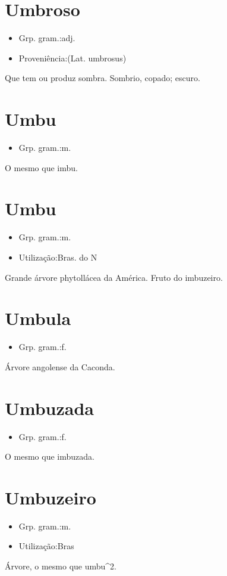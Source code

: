 \documentclass{article}
\begin{document}
\section{Umbroso}
\begin{itemize}
\item {Grp. gram.:adj.}
\end{itemize}
\begin{itemize}
\item {Proveniência:(Lat. \textunderscore umbrosus\textunderscore )}
\end{itemize}
Que tem ou produz sombra.
Sombrio, copado; escuro.
\section{Umbu}
\begin{itemize}
\item {Grp. gram.:m.}
\end{itemize}
O mesmo que \textunderscore imbu\textunderscore .
\section{Umbu}
\begin{itemize}
\item {Grp. gram.:m.}
\end{itemize}
\begin{itemize}
\item {Utilização:Bras. do N}
\end{itemize}
Grande árvore phytollácea da América.
Fruto do imbuzeiro.
\section{Umbula}
\begin{itemize}
\item {Grp. gram.:f.}
\end{itemize}
Árvore angolense da Caconda.
\section{Umbuzada}
\begin{itemize}
\item {Grp. gram.:f.}
\end{itemize}
O mesmo que \textunderscore imbuzada\textunderscore .
\section{Umbuzeiro}
\begin{itemize}
\item {Grp. gram.:m.}
\end{itemize}
\begin{itemize}
\item {Utilização:Bras}
\end{itemize}
Árvore, o mesmo que \textunderscore umbu\textunderscore ^2.
\end{document}

